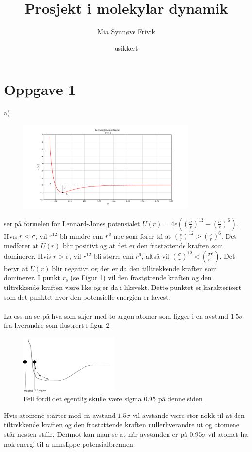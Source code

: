 \documentclass{article}
\title{Prosjekt i molekylar dynamik}
\author{Mia Synnøve Frivik}
\date{usikkert}
\begin{document}
\maketitle
\newpage
\section*{Oppgave 1}
a) 
\begin{figure}[h!]
 \centering
  \includegraphics[width=0.80\textwidth]{Figure_1.png}
  \caption{}
\end{figure}

ser på formelen for Lennard-Jones potensialet $U(r) = 4\epsilon ((\frac{\sigma}{r})^{12} - (\frac{\sigma}{r})^6)$. Hvis $r < \sigma$, vil $r^{12}$ bli mindre enn $r^{6}$ noe som fører til at $(\frac{\sigma}{r})^{12} > (\frac{\sigma}{r})^6$. Det medfører at $U(r)$ blir positivt og at det er den frastøttende kraften som dominerer. Hvis $r > \sigma$, vil $r^{12}$ bli større enn $r^6$, altså vil $(\frac{\sigma}{r})^{12} < (\frac{\sigma}{r}^6)$. Det betyr at $U(r)$ blir negativt og det er da den tilltrekkende kraften som dominerer. I punkt $r_{0}$ (se Figur 1) vil den frastøttende kraften og den tiltrekkende kraften være like og er da i likevekt. Dette punktet er karakterisert som det punktet hvor den potensielle energien er lavest.\\
\\
La oss nå se på hva som skjer med to argon-atomer som ligger i en avstand $ 1.5 \sigma$fra hverandre som ilustrert i figur 2   
\begin{figure}[h!]
 \centering
  \includegraphics[width=50mm, scale=0.01]{Bilde_2.png}
  \caption{Feil fordi det egentlig skulle være sigma 0.95 på denne siden}
\end{figure}
\newpage
Hvis atomene starter med en avstand $1.5 \sigma$ vil avstande være stor nokk til at den tiltrekkende kraften og den frastøttende kraften nullerhverandre ut og atomene står nesten stille. Derimot kan man se at når avstanden er på $0.95  \sigma$ vil atomet ha nok energi til å unnslippe potensialbrønnen.
\end{document}
